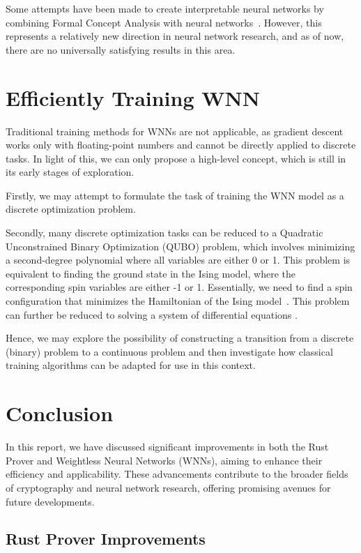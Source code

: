 \documentclass{article}[12pt]
\begin{document}
Some attempts have been made to create interpretable neural networks by combining Formal Concept Analysis with neural networks~\cite{parakal2022intrinsically, dudyrev2022human, kuznetsov2022pattern}.
However, this represents a relatively new direction in neural network research, and as of now, there are no universally satisfying results in this area.

\section{Efficiently Training WNN}\label{sec:training-wnn}
Traditional training methods for WNNs are not applicable, as gradient descent works only with floating-point numbers and cannot be directly applied to discrete tasks.
In light of this, we can only propose a high-level concept, which is still in its early stages of exploration.

Firstly, we may attempt to formulate the task of training the WNN model as a discrete optimization problem.

Secondly, many discrete optimization tasks can be reduced to a Quadratic Unconstrained Binary Optimization (QUBO) problem, which involves minimizing a second-degree polynomial where all variables are either 0 or 1.
This problem is equivalent to finding the ground state in the Ising model, where the corresponding spin variables are either -1 or 1.
Essentially, we need to find a spin configuration that minimizes the Hamiltonian of the Ising model~\cite{glover2018logical}.
This problem can further be reduced to solving a system of differential equations \cite{goto2019combinatorial, goto2021high}.

Hence, we may explore the possibility of constructing a transition from a discrete (binary) problem to a continuous problem and then investigate how classical training algorithms can be adapted for use in this context.

\section{Conclusion}\label{sec:conclusion}

In this report, we have discussed significant improvements in both the Rust Prover and Weightless Neural Networks (WNNs), aiming to enhance their efficiency and applicability.
These advancements contribute to the broader fields of cryptography and neural network research, offering promising avenues for future developments.

\subsection{Rust Prover Improvements}\label{subsec:prover-conclusion}
\end{document}
